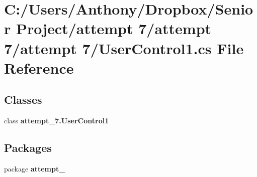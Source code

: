 \section{C:/Users/Anthony/Dropbox/Senior Project/attempt 7/attempt 7/attempt 7/UserControl1.cs File Reference}
\label{_user_control1_8cs}
\subsection*{Classes}
\begin{DoxyCompactItemize}
\item 
class {\bf attempt\_\-7.UserControl1}
\end{DoxyCompactItemize}
\subsection*{Packages}
\begin{DoxyCompactItemize}
\item 
package {\bf attempt\_}
\end{DoxyCompactItemize}
